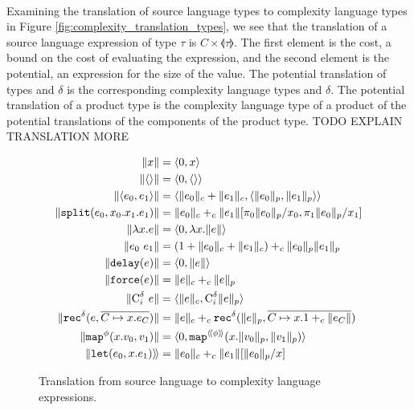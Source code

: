 \paragraph{}
Examining the translation of source language types to complexity language types
in Figure \ref{fig:complexity_translation_types}, we see that the translation
of a source language expression of type $\tau$ is
$\textit{C}\times\llangle\tau\rrangle$.  The first element is the cost, a bound
on the cost of evaluating the expression, and the second element is the
potential, an expression for the size of the value.  The potential translation
of types  and $\delta$ is the corresponding complexity language types
 and $\delta$. The potential translation of a product type is the
complexity language type of a product of the potential translations of the
components of the product type.
TODO EXPLAIN TRANSLATION MORE
%
\begin{figure}
  \caption{Translation from source language to complexity language expressions.}
  \label{fig:complexity_translation_expressions}
  \begin{align*}
    \|x\| &= \langle 0, x \rangle \\
    \|\langle\rangle\| &= \langle 0, \langle\rangle\rangle \\
    \|\langle e_0,e_1 \rangle\| &= \langle \|e_0\|_c + \|e_1\|_c, \langle \|e_0\|_p, \|e_1\|_p\rangle\rangle \\
    \|\texttt{split}(e_0, x_0.x_1.e_1)\| &= \|e_0\|_c +_c \|e_1\|[\pi_0\|e_0\|_p/x_0, \pi_1\|e_0\|_p/x_1] \\
    \|\lambda x.e\| &= \langle 0, \lambda x.\|e\| \rangle \\
    \|e_0\ e_1\| &= (1 + \|e_0\|_c + \|e_1\|_c) +_c \|e_0\|_p \|e_1\|_p \\
    \|\texttt{delay}(e)\| &= \langle 0, \|e\|\rangle \\
    \|\texttt{force}(e)\| &= \|e\|_c +_c \|e\|_p \\
    \|\text{C}^\delta_i\ e\| &= \langle \|e\|_c, \text{C}^\delta_i \|e\|_p \rangle \\
    \|\texttt{rec}^\delta(e, \overline{C \mapsto x.e_C})\| &= \|e\|_c +_c \texttt{rec}^\delta(\|e\|_p, \overline{C \mapsto x.1 +_c \|e_C\|}) \\
    \|\texttt{map}^\phi(x.v_0, v_1)\| &= \langle 0, \texttt{map}^{\langle\!\langle \phi \rangle\!\rangle}(x.\|v_0\|_p, \|v_1\|_p)\rangle \\
    \|\texttt{let}(e_0, x.e_1)\rangle\!\rangle &= \|e_0\|_c +_c \|e_1\|[\|e_0\|_p/x]
  \end{align*}
\end{figure}



